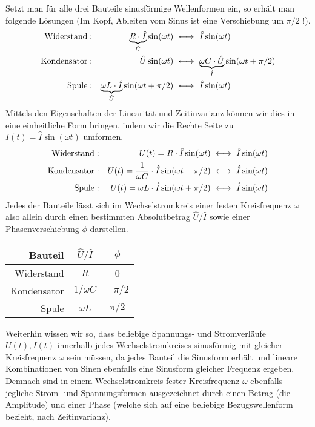Setzt man für alle drei Bauteile sinusförmige Wellenformen ein, so erhält man folgende Lösungen (Im Kopf, Ableiten vom Sinus ist eine Verschiebung um $\pi/2$ !).
\begin{align*}
    \text{Widerstand} &: & \underbrace{R\cdot \hat I}_{\hat U}\sin(\omega t)
    & ~\longleftrightarrow~ \hat{I}\sin(\omega t)
    \\
    \text{Kondensator} &: & \hat U\sin(\omega t)
    & ~\longleftrightarrow~ \underbrace{\omega C \cdot \hat U}_{\hat{I}}\sin(\omega t + \pi/2)
    \\
\text{Spule} &: &  \underbrace{\omega L\cdot \hat I}_{\hat U}\sin(\omega t + \pi/2)
    & ~\longleftrightarrow~ \hat{I}\sin(\omega t)
\end{align*}
Mittels den Eigenschaften der Linearität und Zeitinvarianz können wir dies in eine einheitliche Form bringen, indem wir die Rechte Seite zu $I(t) = \hat I\sin(\omega t)$ umformen.
\begin{align*}
    \text{Widerstand} &: & U(t) = R \cdot \hat I\sin(\omega t)
    & ~\longleftrightarrow~ \hat{I}\sin(\omega t)
    \\
    \text{Kondensator} &: & U(t) = {1\over \omega C}\cdot  \hat I\sin(\omega t - \pi/2)
    & ~\longleftrightarrow~ \hat{I}\sin(\omega t)
    \\
\text{Spule} &: &  U(t) = \omega L \cdot \hat I\sin(\omega t + \pi/2)
    & ~\longleftrightarrow~ \hat{I}\sin(\omega t)
\end{align*}
Jedes der Bauteile lässt sich im Wechselstromkreis einer festen Kreisfrequenz $\omega$ also allein durch einen bestimmten Absolutbetrag $\hat U / \hat I$ sowie einer Phasenverschiebung $\phi$ darstellen.
\begin{center}
    \begin{tabular}{rcc}
        Bauteil & $\hat U / \hat I$ & $\phi$ \\
        \hline
        Widerstand & $R$ & 0 \\
        Kondensator & ${1/\omega C}$ & $-\pi/2$ \\
        Spule & $\omega L$ & $\pi/2$
    \end{tabular}
\end{center}

Weiterhin wissen wir so, dass beliebige Spannungs- und Stromverläufe $U(t), I(t)$ innerhalb jedes Wechselstromkreises sinusförmig mit gleicher Kreisfrequenz $\omega$ sein müssen, da jedes Bauteil die Sinusform erhält und lineare Kombinationen von Sinen ebenfalls eine Sinusform gleicher Frequenz ergeben. Demnach sind in einem Wechselstromkreis fester Kreisfrequenz $\omega$ ebenfalls jegliche Strom- und Spannungsformen ausgezeichnet durch einen Betrag (die Amplitude) und einer Phase (welche sich auf eine beliebige Bezugswellenform bezieht, nach Zeitinvarianz).
